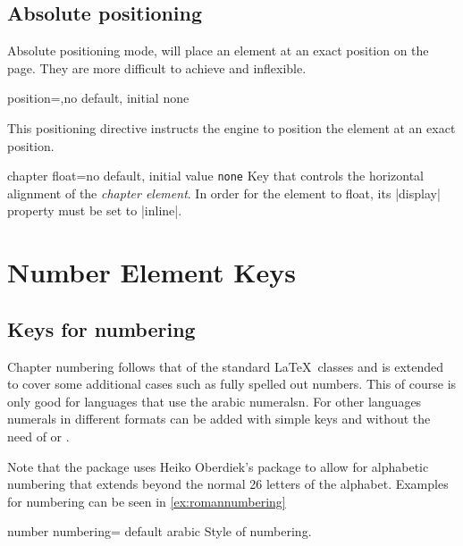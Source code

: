 \subsection{Absolute positioning}

Absolute positioning mode, will place an element at an exact position on the page. They are more difficult to
achieve and inflexible. 

\begin{docKey}{position}{=,}{no default, initial none}{}

\end{docKey}



This positioning directive instructs the engine to position the element at an exact position.


\begin{docKey}[]{chapter float}{=}{no default, initial value \texttt{none}}
Key that controls the horizontal alignment of the \emph{chapter element}. In order for the
element to float, its |display| property must be set to |inline|.
\end{docKey}
\egroup



\section{Number Element Keys}


\subsection*{Keys for numbering}

Chapter numbering follows that of the standard \LaTeX\ classes and is extended to cover some additional cases such as fully spelled out numbers. This of course is only good for languages that use the arabic numeralsn. For other languages numerals in different formats can be added with simple keys and without the need of  or . 

Note that the package uses Heiko Oberdiek's package  to allow for alphabetic numbering that extends beyond the normal 26 letters of the alphabet. Examples for numbering can be seen in \ref{ex:romannumbering}


\begin{docKey}[phd]{number numbering}{= }{default arabic}
Style of numbering.
\end{docKey}

